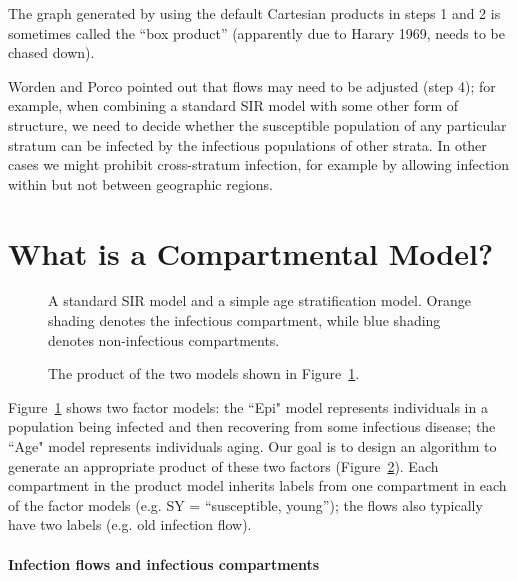 The graph generated by using the default Cartesian products in steps 1 and 2 is sometimes called the “box product” (apparently due to Harary 1969, needs to be chased down).

Worden and Porco pointed out that flows may need to be adjusted (step 4); for example, when combining a standard SIR model with some other form of structure, we need to decide whether the susceptible population of any particular stratum can be infected by the infectious populations of other strata.
In other cases we might prohibit cross-stratum infection, for example by allowing infection within but not between geographic regions. 

\section{What is a Compartmental Model?}\label{dcm}

\FloatBarrier %
\begin{figure}
    \centering
    
    \caption{A standard SIR model and a simple age stratification model. Orange shading denotes the infectious compartment, while blue shading denotes non-infectious compartments.}
    \label{fig:sir_age_strat}
\end{figure}

\begin{figure}
    \centering
    
    \caption{The product of the two models shown in Figure~\ref{fig:sir_age_strat}. }
    \label{fig:simple_sir_age}
\end{figure}

Figure~\ref{fig:sir_age_strat} shows two factor models: the ``Epi" model represents individuals in a population being infected and then recovering from some infectious disease; the ``Age" model represents individuals aging. Our goal is to design an algorithm to generate an appropriate product of these two factors (Figure~\ref{fig:simple_sir_age}). Each compartment in the product model inherits labels from one compartment in each of the factor models (e.g. SY = ``susceptible, young''); the flows also typically have two labels (e.g. old infection flow). 

\paragraph{Infection flows and infectious compartments}

